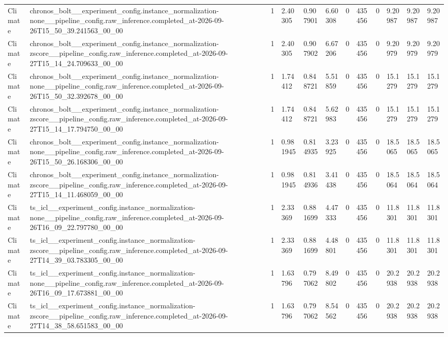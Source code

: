 \begin{tabular}{llllllllllll}
Climate & chronos\_bolt\_\_experiment\_config.instance\_normalization-none\_\_pipeline\_config.raw\_inference.completed\_at-2026-09-26T15\_50\_39.241563\_00\_00 & 1 & 2.40305 & 0.907901 & 6.60308 & 0 & 435456 & 0 & 9.20987 & 9.20987 & 9.20987 \\
Climate & chronos\_bolt\_\_experiment\_config.instance\_normalization-zscore\_\_pipeline\_config.raw\_inference.completed\_at-2026-09-27T15\_14\_24.709633\_00\_00 & 1 & 2.40305 & 0.907902 & 6.67206 & 0 & 435456 & 0 & 9.20979 & 9.20979 & 9.20979 \\
Climate & chronos\_bolt\_\_experiment\_config.instance\_normalization-none\_\_pipeline\_config.raw\_inference.completed\_at-2026-09-26T15\_50\_32.392678\_00\_00 & 1 & 1.74412 & 0.848721 & 5.51859 & 0 & 435456 & 0 & 15.1279 & 15.1279 & 15.1279 \\
Climate & chronos\_bolt\_\_experiment\_config.instance\_normalization-zscore\_\_pipeline\_config.raw\_inference.completed\_at-2026-09-27T15\_14\_17.794750\_00\_00 & 1 & 1.74412 & 0.848721 & 5.62983 & 0 & 435456 & 0 & 15.1279 & 15.1279 & 15.1279 \\
Climate & chronos\_bolt\_\_experiment\_config.instance\_normalization-none\_\_pipeline\_config.raw\_inference.completed\_at-2026-09-26T15\_50\_26.168306\_00\_00 & 1 & 0.981945 & 0.814935 & 3.23925 & 0 & 435456 & 0 & 18.5065 & 18.5065 & 18.5065 \\
Climate & chronos\_bolt\_\_experiment\_config.instance\_normalization-zscore\_\_pipeline\_config.raw\_inference.completed\_at-2026-09-27T15\_14\_11.468059\_00\_00 & 1 & 0.981945 & 0.814936 & 3.41438 & 0 & 435456 & 0 & 18.5064 & 18.5064 & 18.5064 \\
Climate & ts\_icl\_\_experiment\_config.instance\_normalization-none\_\_pipeline\_config.raw\_inference.completed\_at-2026-09-26T16\_09\_22.797780\_00\_00 & 1 & 2.33369 & 0.881699 & 4.47333 & 0 & 435456 & 0 & 11.8301 & 11.8301 & 11.8301 \\
Climate & ts\_icl\_\_experiment\_config.instance\_normalization-zscore\_\_pipeline\_config.raw\_inference.completed\_at-2026-09-27T14\_39\_03.783305\_00\_00 & 1 & 2.33369 & 0.881699 & 4.48801 & 0 & 435456 & 0 & 11.8301 & 11.8301 & 11.8301 \\
Climate & ts\_icl\_\_experiment\_config.instance\_normalization-none\_\_pipeline\_config.raw\_inference.completed\_at-2026-09-26T16\_09\_17.673881\_00\_00 & 1 & 1.63796 & 0.797062 & 8.49802 & 0 & 435456 & 0 & 20.2938 & 20.2938 & 20.2938 \\
Climate & ts\_icl\_\_experiment\_config.instance\_normalization-zscore\_\_pipeline\_config.raw\_inference.completed\_at-2026-09-27T14\_38\_58.651583\_00\_00 & 1 & 1.63796 & 0.797062 & 8.54562 & 0 & 435456 & 0 & 20.2938 & 20.2938 & 20.2938 \\

\end{tabular}
